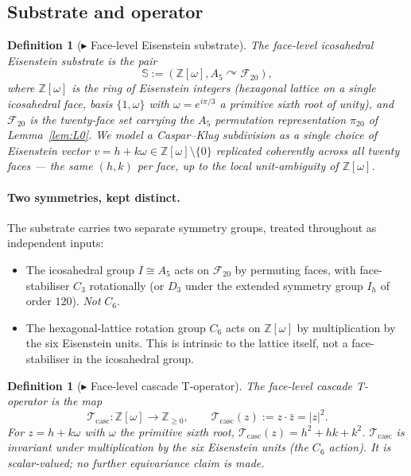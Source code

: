 \documentclass[12pt]{article}
\newtheorem{definition}[theorem]{Definition}
\newcommand{\Tcasc}{\mathcal{T}_{\mathrm{casc}}}
\newcommand{\Zom}{\mathbb{Z}[\omega]}
\begin{document}
\subsection{Substrate and operator}

\begin{definition}[$\blacktriangleright$ Face-level Eisenstein substrate]\label{def:D1}
The \emph{face-level icosahedral Eisenstein substrate} is the pair
\[
\mathbb{S} := (\Zom, A_5 \curvearrowright \mathcal{F}_{20}),
\]
where $\Zom$ is the ring of Eisenstein integers (hexagonal lattice on a
single icosahedral face, basis $\{1, \omega\}$ with $\omega = e^{i\pi/3}$
a primitive sixth root of unity), and $\mathcal{F}_{20}$ is the twenty-face
set carrying the $A_5$ permutation representation $\pi_{20}$ of
Lemma~\ref{lem:L0}. We model a Caspar--Klug subdivision as a single choice of
Eisenstein vector $v = h + k\omega \in \Zom \setminus \{0\}$ replicated
coherently across all twenty faces --- the same $(h, k)$ per face, up
to the local unit-ambiguity of $\Zom$.
\end{definition}

\paragraph{Two symmetries, kept distinct.} The substrate carries two
separate symmetry groups, treated throughout as independent inputs:
\begin{itemize}
\item The icosahedral group $I \cong A_5$ acts on $\mathcal{F}_{20}$
  by permuting faces, with face-stabiliser $C_3$ rotationally (or
  $D_3$ under the extended symmetry group $I_h$ of order $120$).
  \emph{Not} $C_6$.
\item The hexagonal-lattice rotation group $C_6$ acts on $\Zom$ by
  multiplication by the six Eisenstein units. This is intrinsic to
  the lattice itself, not a face-stabiliser in the icosahedral group.
\end{itemize}

\begin{definition}[$\blacktriangleright$ Face-level cascade T-operator]\label{def:D2}
The \emph{face-level cascade T-operator} is the map
\[
\Tcasc : \Zom \to \mathbb{Z}_{\ge 0},\qquad
\Tcasc(z) := z\cdot\bar{z} = |z|^2.
\]
For $z = h + k\omega$ with $\omega$ the primitive sixth root,
$\Tcasc(z) = h^2 + hk + k^2$. $\Tcasc$ is invariant under
multiplication by the six Eisenstein units (the $C_6$ action). It is
scalar-valued; no further equivariance claim is made.
\end{definition}
\end{document}
